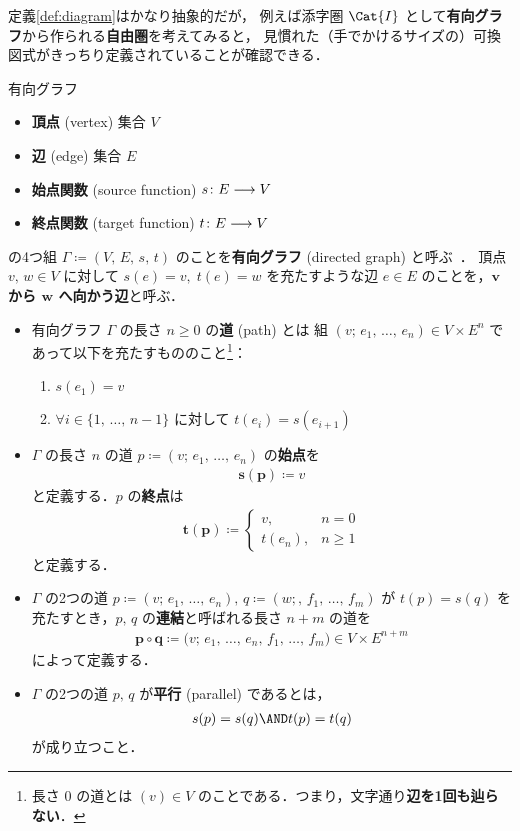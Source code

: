\documentclass[geometry_main]{subfiles}
\begin{document}
定義\ref{def:diagram}はかなり抽象的だが，
例えば添字圏 $\Cat{I}$ として\textbf{有向グラフ}から作られる\textbf{自由圏}を考えてみると，
見慣れた（手でかけるサイズの）可換図式がきっちり定義されていることが確認できる．

\begin{mydef}[label=def:DG, breakable]{有向グラフ}
	\begin{itemize}
		\item \textbf{頂点} (vertex) 集合 $V$
		\item \textbf{辺} (edge) 集合 $E$
		\item \textbf{始点関数} (source function) $s \colon E \longrightarrow V$
		\item \textbf{終点関数} (target function) $t \colon E \longrightarrow V$
	\end{itemize}
	の4つ組 $\Gamma \coloneqq (V,\, E,\, s,\, t)$ のことを\textbf{有向グラフ} (directed graph) と呼ぶ~\cite{Brendan}．
	頂点 $v,\, w \in V$ に対して $s(e) = v,\; t(e) = w$ を充たすような辺 $e \in E$ のことを，\textbf{$\bm{v}$ から $\bm{w}$ へ向かう辺}と呼ぶ．
	\tcblower
	\begin{itemize}
		\item 有向グラフ $\Gamma$ の長さ $n \ge 0$ の\textbf{道} (path) とは
		組 $(v;\, e_1,\, \dots,\, e_n) \in V \times E^n$ であって以下を充たすもののこと\footnote{長さ $0$ の道とは $(v) \in V$ のことである．つまり，文字通り\textbf{辺を1回も辿らない}．}：
		\begin{enumerate}
			\item $s(e_1) = v$
			\item $\forall i \in \{1,\, \dots,\, n-1\}$ に対して $t(e_i) = s(e_{i+1})$
		\end{enumerate}
		\item $\Gamma$ の長さ $n$ の道 $p \coloneqq (v;\, e_1,\, \dots,\, e_n)$ の\textbf{始点}を
		\begin{align}
			\bm{s(p)} \coloneqq v
		\end{align}
		と定義する．$p$ の\textbf{終点}は
		\begin{align}
			\bm{t(p)} \coloneqq
			\begin{cases}
				v, &n=0 \\
				t(e_n), &n \ge 1
			\end{cases}
		\end{align}
		と定義する．
		\item $\Gamma$ の2つの道 $p \coloneqq (v;\, e_1,\, \dots,\, e_n),\, q \coloneqq (w;,\, f_1,\, \dots,\, f_m)$ が $t(p) = s(q)$ を充たすとき，$p,\, q$ の\textbf{連結}と呼ばれる長さ $n+m$ の道を
		\begin{align}
			\bm{p \circ q} \coloneqq \bigl(v;\, e_1,\, \dots,\, e_n,\, f_1,\, \dots,\, f_m \bigr) \in V \times E^{n+m}
		\end{align}
		によって定義する．
		\item $\Gamma$ の2つの道 $p,\, q$ が\textbf{平行} (parallel) であるとは，
		\begin{align}
			s(p) = s(q)\AND t(p) = t(q)
		\end{align}
		が成り立つこと．
	\end{itemize}
\end{mydef}
\end{document}
